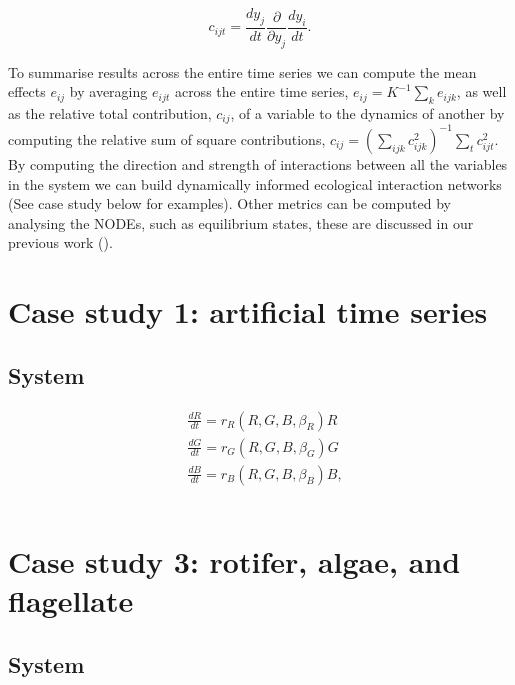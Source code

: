 \documentclass[11pt, oneside]{article}
\begin{document}
\vspace{-0.5cm}
\begin{equation}
    c_{ijt} = \frac{dy_j}{dt} \frac{\partial}{\partial y_j} \frac{dy_i}{dt}.
\end{equation}

To summarise results across the entire time series we can compute the mean effects $e_{ij}$ by averaging $e_{ijt}$ across the entire time series, $e_{ij} = K^{-1} \sum_k e_{ijk}$, as well as the relative total contribution, $c_{ij}$, of a variable to the dynamics of another by computing the relative sum of square contributions, $c_{ij} = \left( \sum_{ijk} c_{ijk}^{2} \right)^{-1} \sum_t c_{ijt}^2$. By computing the direction and strength of interactions between all the variables in the system we can build dynamically informed ecological interaction networks (See case study below for examples).
Other metrics can be computed by analysing the NODEs, such as equilibrium states, these are discussed in our previous work (\cite{Bonnaffe2021a}). 

\section{Case study 1: artificial time series}

\subsection{System}

\vspace{-0.5cm}
\begin{equation} \begin{aligned}
	& \frac{dR}{dt} = r_R(R,G,B,\beta_R) R \\
	& \frac{dG}{dt} = r_G(R,G,B,\beta_G) G \\
	& \frac{dB}{dt} = r_B(R,G,B,\beta_B) B,
\end{aligned} \end{equation}

\begin{equation}
\end{equation}


\section{Case study 3: rotifer, algae, and flagellate}

\subsection{System}
\end{document}
